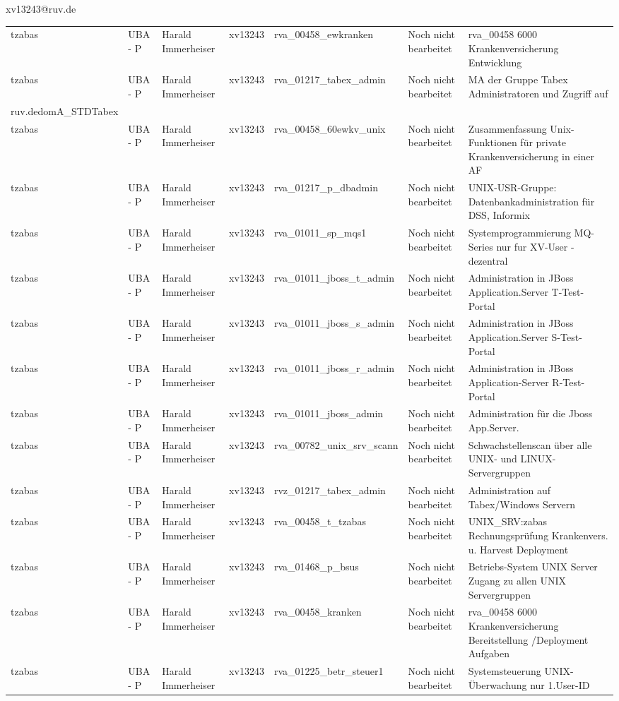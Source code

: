 \documentclass[a4paper,landscape,12pt]{letter}
\begin{document}
\begin{letter}{xv13243@ruv.de\hfill \break}
\begin{tiny}
\begin{longtable}{|p{35mm}|p{15mm}|p{25mm}|p{10mm}|p{40mm}|p{50mm}|p{50mm}|}
tzabas & UBA - P & Harald Immerheiser & xv13243 & rva\_00458\_ewkranken & Noch nicht bearbeitet & rva\_00458 6000 Krankenversicherung Entwicklung \\
tzabas & UBA - P & Harald Immerheiser & xv13243 & rva\_01217\_tabex\_admin & Noch nicht bearbeitet & MA der Gruppe Tabex Administratoren und Zugriff auf \\ruv.dedomA\_STDTabex \\
tzabas & UBA - P & Harald Immerheiser & xv13243 & rva\_00458\_60ewkv\_unix & Noch nicht bearbeitet & Zusammenfassung Unix-Funktionen für private Krankenversicherung in einer AF \\
tzabas & UBA - P & Harald Immerheiser & xv13243 & rva\_01217\_p\_dbadmin & Noch nicht bearbeitet & UNIX-USR-Gruppe: Datenbankadministration für  DSS, Informix \\
tzabas & UBA - P & Harald Immerheiser & xv13243 & rva\_01011\_sp\_mqs1 & Noch nicht bearbeitet & Systemprogrammierung MQ-Series nur fur XV-User - dezentral \\
tzabas & UBA - P & Harald Immerheiser & xv13243 & rva\_01011\_jboss\_t\_admin & Noch nicht bearbeitet & Administration in JBoss Application.Server T-Test-Portal \\
tzabas & UBA - P & Harald Immerheiser & xv13243 & rva\_01011\_jboss\_s\_admin & Noch nicht bearbeitet & Administration in JBoss Application.Server S-Test-Portal \\
tzabas & UBA - P & Harald Immerheiser & xv13243 & rva\_01011\_jboss\_r\_admin & Noch nicht bearbeitet & Administration in JBoss Application-Server R-Test-Portal \\
tzabas & UBA - P & Harald Immerheiser & xv13243 & rva\_01011\_jboss\_admin & Noch nicht bearbeitet & Administration für die Jboss App.Server. \\
tzabas & UBA - P & Harald Immerheiser & xv13243 & rva\_00782\_unix\_srv\_scann & Noch nicht bearbeitet & Schwachstellenscan über alle UNIX- und LINUX-Servergruppen \\
tzabas & UBA - P & Harald Immerheiser & xv13243 & rvz\_01217\_tabex\_admin & Noch nicht bearbeitet & Administration auf Tabex/Windows Servern \\
tzabas & UBA - P & Harald Immerheiser & xv13243 & rva\_00458\_t\_tzabas & Noch nicht bearbeitet & UNIX\_SRV:zabas Rechnungsprüfung Krankenvers. u. Harvest Deployment \\
tzabas & UBA - P & Harald Immerheiser & xv13243 & rva\_01468\_p\_bsus & Noch nicht bearbeitet & Betriebs-System UNIX Server Zugang zu allen UNIX Servergruppen \\
tzabas & UBA - P & Harald Immerheiser & xv13243 & rva\_00458\_kranken & Noch nicht bearbeitet & rva\_00458 6000 Krankenversicherung Bereitstellung /Deployment Aufgaben \\
tzabas & UBA - P & Harald Immerheiser & xv13243 & rva\_01225\_betr\_steuer1 & Noch nicht bearbeitet & Systemsteuerung UNIX-Überwachung nur 1.User-ID \\


\end{longtable}
\end{tiny}
\end{letter}
\end{document}
